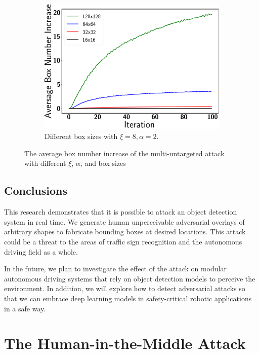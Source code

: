 \begin{figure}[H]
\begin{subfigure}[b]{0.59\textwidth}
    \centering
    \includegraphics[width=\textwidth]{figures/chapter_detection/detection/multi_untargeted_box_box.png}
    \caption{Different box sizes with $\xi=8, \alpha=2$.}
    \label{fig:box_box}
\end{subfigure}
\caption{The average box number increase of the multi-untargeted attack with different $\xi$, $\alpha$, and box sizes}
\label{fig.hyper_box}
\end{figure}

\vfill

\clearpage

\subsection{Conclusions}

This research demonstrates that it is possible to attack an object detection system in real time. We generate human unperceivable adversarial overlays of arbitrary shapes to fabricate bounding boxes at desired locations. This attack could be a threat to the areas of traffic sign recognition and the autonomous driving field as a whole.

In the future, we plan to investigate the effect of the attack on modular autonomous driving systems that rely on object detection models to perceive the environment. In addition, we will explore how to detect adversarial attacks so that we can embrace deep learning models in safety-critical robotic applications in a safe way.


\section{The Human-in-the-Middle Attack}

